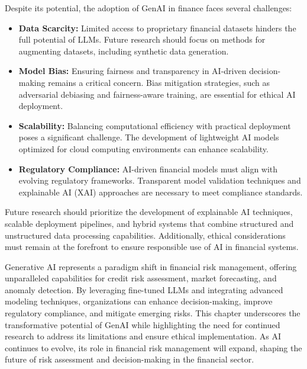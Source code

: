 \documentclass[a4paper,12pt]{scrbook}
\begin{document}
	
	Despite its potential, the adoption of GenAI in finance faces several challenges:
	
	\begin{itemize}
		\item \textbf{Data Scarcity:} Limited access to proprietary financial datasets hinders the full potential of LLMs. Future research should focus on methods for augmenting datasets, including synthetic data generation.
		\item \textbf{Model Bias:} Ensuring fairness and transparency in AI-driven decision-making remains a critical concern. Bias mitigation strategies, such as adversarial debiasing and fairness-aware training, are essential for ethical AI deployment.
		\item \textbf{Scalability:} Balancing computational efficiency with practical deployment poses a significant challenge. The development of lightweight AI models optimized for cloud computing environments can enhance scalability.
		\item \textbf{Regulatory Compliance:} AI-driven financial models must align with evolving regulatory frameworks. Transparent model validation techniques and explainable AI (XAI) approaches are necessary to meet compliance standards.
	\end{itemize}
	
	Future research should prioritize the development of explainable AI techniques, scalable deployment pipelines, and hybrid systems that combine structured and unstructured data processing capabilities. Additionally, ethical considerations must remain at the forefront to ensure responsible use of AI in financial systems.
	
	
	Generative AI represents a paradigm shift in financial risk management, offering unparalleled capabilities for credit risk assessment, market forecasting, and anomaly detection. By leveraging fine-tuned LLMs and integrating advanced modeling techniques, organizations can enhance decision-making, improve regulatory compliance, and mitigate emerging risks. This chapter underscores the transformative potential of GenAI while highlighting the need for continued research to address its limitations and ensure ethical implementation. As AI continues to evolve, its role in financial risk management will expand, shaping the future of risk assessment and decision-making in the financial sector.
	
\end{document}
